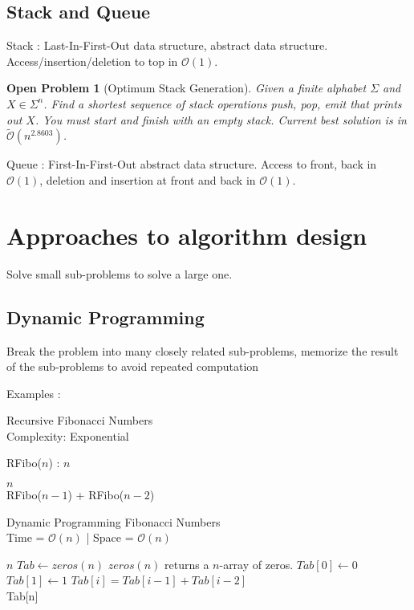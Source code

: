 \documentclass[12pt]{cours}
\newtheorem{openpb}{Open Problem}
\begin{document}
\subsection{Stack and Queue}
Stack : Last-In-First-Out data structure, abstract data structure. Access/insertion/deletion to top in $\mathcal{O}(1)$.

\begin{openpb}[Optimum Stack Generation]
    Given a finite alphabet $\Sigma$ and $X \in \Sigma^{n}$. Find a shortest sequence of stack operations push, pop, emit that prints out $X$. You must start and finish with an empty stack.
    Current best solution is in $\tilde{\mathcal{O}}(n^{2.8603})$.
\end{openpb}

Queue : First-In-First-Out abstract data structure. Access to front, back in $\mathcal{O}(1)$, deletion and insertion at front and back in $\mathcal{O}(1)$.

\section{Approaches to algorithm design}
Solve small sub-problems to solve a large one.

\subsection{Dynamic Programming}
Break the problem into many closely related sub-problems, memorize the result of the sub-problems to avoid repeated computation

Examples :
\begin{algorithm}
    \caption{Recursive Fibonacci Numbers \\ Complexity: Exponential}
    \begin{algorithmic}
        \State RFibo($n$) :
        \Input
        $ n$
        \EndInput

        \Return $n$
        \EndIf\\
        \Return RFibo($n-1$) + RFibo($n-2$)
    \end{algorithmic}
\end{algorithm}

\begin{algorithm}
    \caption{Dynamic Programming Fibonacci Numbers \\ Time = $\mathcal{O}(n)$ | Space = $\mathcal{O}(n)$}
    \begin{algorithmic}
        \Input
        $ n$
        \EndInput   
        \State $Tab \gets zeros(n)$ \Comment $zeros(n)$ returns a $n$-array of zeros.
        \State $Tab[0] \gets 0$
        \State $Tab[1] \gets 1$
        \State $Tab[i] = Tab[i-1] + Tab[i-2]$
        \EndFor\\
        \Return Tab[n]
    \end{algorithmic}
\end{algorithm}
\end{document}
